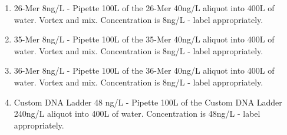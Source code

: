 \documentclass[letterpaper]{article}
\newcommand{\uL}{\micro{}L}
\begin{document}
\begin{enumerate}
\item{26-Mer 8ng/\uL{} - Pipette 100\uL{} of the 26-Mer 40ng/\uL{} aliquot into 400\uL{} of water. Vortex and mix. Concentration is 8ng/\uL{} - label appropriately.}
\item{35-Mer 8ng/\uL{} - Pipette 100\uL{} of the 35-Mer 40ng/\uL{} aliquot into 400\uL{} of water. Vortex and mix. Concentration is 8ng/\uL{} - label appropriately.}
\item{36-Mer 8ng/\uL{} - Pipette 100\uL{} of the 36-Mer 40ng/\uL{} aliquot into 400\uL{} of water. Vortex and mix. Concentration is 8ng/\uL{} - label appropriately.}
\item{Custom DNA Ladder 48 ng/\uL{} - Pipette 100\uL{} of the Custom DNA Ladder 240ng/\uL{} aliquot into 400\uL{} of water. Concentration is 48ng/\uL{} - label appropriately. }
\end{enumerate}
\end{document}
